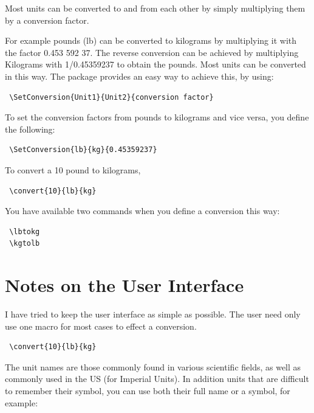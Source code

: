 \documentclass{tufte-book}
\gdef\SetConversion#1#2#3{%
\expandafter\gdef\csname#1#2\endcsname{#3}%
\gdef\Temp{#3}
\FPdiv\invert{1}{\Temp}
\expandafter\gdef\csname#2#1\endcsname{\invert}
}
\begin{document}
Most units can be converted to and from each other by simply multiplying them by a conversion factor.

For example pounds (lb) can be converted to kilograms by multiplying it with the factor 0.453 592 37. The reverse conversion can be achieved by multiplying Kilograms with 1/0.45359237 to obtain the pounds. Most units can be converted in this way. The package provides an easy way to achieve this, by using:






\begin{lstlisting}
 \SetConversion{Unit1}{Unit2}{conversion factor}
\end{lstlisting}

To set the conversion factors from pounds to kilograms and vice versa, you define the following:

\begin{lstlisting}
 \SetConversion{lb}{kg}{0.45359237}
\end{lstlisting}

To convert a 10 pound to kilograms,

\begin{lstlisting}
 \convert{10}{lb}{kg}
\end{lstlisting}

You have available two commands when you define a conversion this way:

\begin{lstlisting}
 \lbtokg
 \kgtolb
\end{lstlisting}

\section{Notes on the User Interface}

I have tried to keep the user interface as simple as possible. The user need only use one macro for most cases to effect a conversion.

\begin{lstlisting}
 \convert{10}{lb}{kg}
\end{lstlisting}

The unit names are those commonly found in various scientific fields, as well as commonly used in the US (for Imperial Units). In addition units that are difficult to remember their symbol, you can use both their full name or a symbol, for example:
\end{document}
